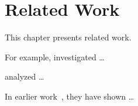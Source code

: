 \chapter{Related Work}\label{ch:relatedwork}

This chapter presents related work.

For example, \citet{KG:SME06} investigated \dots

\citet{ABKS:BOOK2013} analyzed \dots

In earlier work~\cite{KAK:GPCE09,ABKS:BOOK2013}, they have shown \dots
